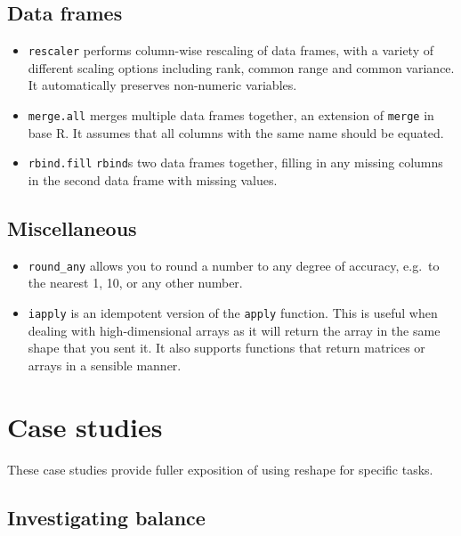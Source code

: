 \documentclass[oneside,letterpaper]{scrartcl}
\begin{document}
\subsection{Data frames}\label{sub:data_related}

\begin{itemize}
	\item {\tt rescaler} performs column-wise rescaling of data frames,  with a variety of different scaling options including rank, common range and common variance.  It automatically preserves non-numeric variables.
	\item {\tt merge.all} merges multiple data frames together, an extension of {\tt merge} in base R.  It assumes that all columns with the same name should be equated.
	\item {\tt rbind.fill} {\tt rbind}s two data frames together, filling in any missing columns in the second data frame with missing values.
\end{itemize}

\subsection{Miscellaneous}\label{sub:miscellaneous}

\begin{itemize}
	\item {\tt round\_any} allows you to round a number to any degree of accuracy, e.g.\ to the nearest 1, 10, or any other number. 
	

	\item {\tt iapply} is an idempotent version of the {\tt apply} function.  This is useful when dealing with high-dimensional arrays as it will return the array in the same shape that you sent it.  It also supports functions that return matrices or arrays in a sensible manner.
\end{itemize}

\newpage
\section{Case studies}\label{sec:case-studies}

These case studies provide fuller exposition of using reshape for specific tasks.

\subsection{Investigating balance}\label{sub:investigating_balance}
\end{document}
